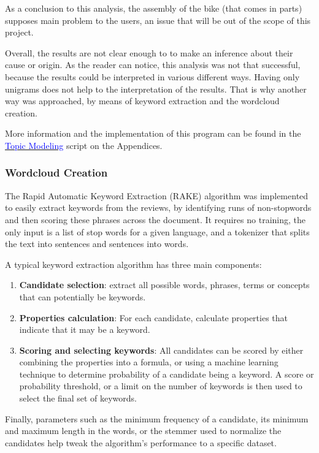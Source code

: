 As a conclusion to this analysis, the assembly of the bike (that comes in parts) supposes main problem to the users, an issue that will be out of the scope of this project. 

Overall, the results are not clear enough to to make an inference about their cause or origin. As the reader can notice, this analysis was not that successful, because the results could be interpreted in various different ways. Having only unigrams does not help to the interpretation of the results. That is why another way was approached, by means of keyword extraction and the wordcloud creation.

More information and the implementation of this program can be found in the
\hyperref[Topic_Modeling_Amazon_Reviews]{\textcolor{blue}{Topic Modeling}} script on the Appendices.

\subsubsection{\textbf{Wordcloud Creation}}

The Rapid Automatic Keyword Extraction (RAKE)\cite{rake} algorithm was implemented to easily extract keywords from the reviews, by identifying runs of non-stopwords and then scoring these phrases across the document. It requires no training, the only input is a list of stop words for a given language, and a tokenizer that splits the text into sentences and sentences into words.
 


A typical keyword extraction algorithm has three main components:
\begin{enumerate}\itemsep -10pt
	\item \textbf{Candidate selection}: extract all possible words, phrases, terms or concepts that can potentially be keywords.
	\item \textbf{Properties calculation}: For each candidate, calculate properties that indicate that it may be a keyword.
	\item \textbf{Scoring and selecting keywords}: All candidates can be scored by either combining the properties into a formula, or using a machine learning technique to determine probability of a candidate being a keyword. A score or probability threshold, or a limit on the number of keywords is then used to select the final set of keywords.
\end{enumerate}
	Finally, parameters such as the minimum frequency of a candidate, its minimum and maximum length in the words, or the stemmer used to normalize the candidates help tweak the algorithm's performance to a specific dataset.
	
